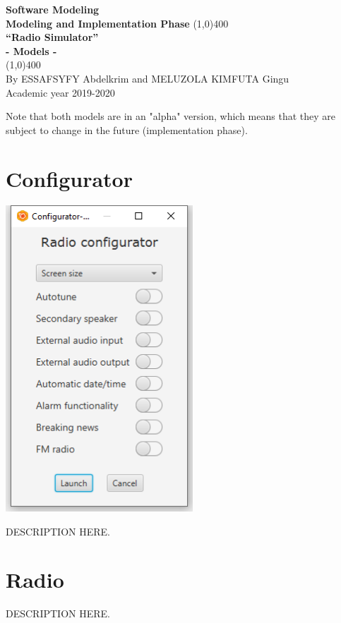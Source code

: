 \documentclass[11pt]{article}
\begin{document}
\begin{titlepage}
\begin{center}
\vspace*{1cm}
\Large{\textbf{Software Modeling}}\\
\Large{\textbf{Modeling and Implementation Phase}}
\vfill
\line(1,0){400}\\[1mm]
\huge{\textbf{“Radio Simulator”}}\\[3mm]
\Large{\textbf{- Models -}}\\[1mm]
\line(1,0){400}\\
\vfill
By ESSAFSYFY Abdelkrim and MELUZOLA KIMFUTA Gingu\\
Academic year 2019-2020

\end{center}
\end{titlepage}

\tableofcontents
\thispagestyle{empty} %
\clearpage %
\setcounter{page}{1} %

Note that both models are in an "alpha" version, which means that they are subject to change in the future (implementation phase).

\section{Configurator}
\vspace{20px}
\begin{center}
\includegraphics[width=7cm]{../Screenshots/configurator-v2.png}\\
\end{center}
DESCRIPTION HERE.


\section{Radio}
\vspace{10px}
\begin{center}
\end{center}
DESCRIPTION HERE.
\end{document}
